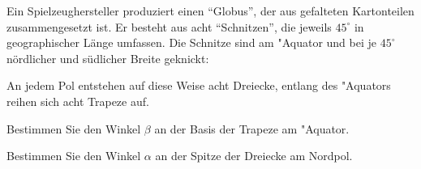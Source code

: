 Ein Spielzeughersteller produziert einen ``Globus'', der aus gefalteten
Kartonteilen zusammengesetzt ist. Er besteht aus acht ``Schnitzen'',
die jeweils $45^\circ$ in geographischer Länge umfassen. Die Schnitze
sind am "Aquator und bei je $45^\circ$ nördlicher und südlicher Breite
geknickt:
\begin{center}
\end{center}
An jedem Pol entstehen auf diese Weise acht Dreiecke, entlang des
"Aquators reihen sich acht Trapeze auf.
\begin{teilaufgaben}
\item
Bestimmen Sie den Winkel $\beta$ an der Basis der Trapeze am "Aquator.
\item Bestimmen Sie den Winkel $\alpha$ an der Spitze der Dreiecke am Nordpol.
\end{teilaufgaben}

